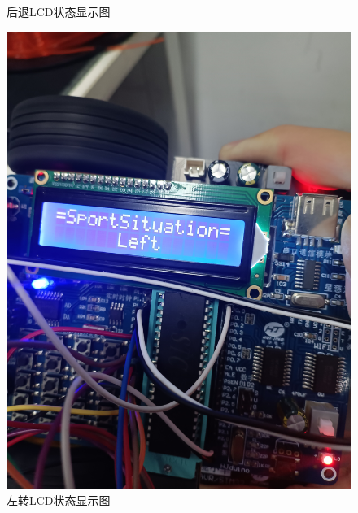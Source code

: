 \begin{figure}[htbp]
\begin{minipage}{0.49\linewidth}
		\caption{后退LCD状态显示图}
		\label{backward}%
	\end{minipage}
	
	\begin{minipage}{0.49\linewidth}
		\centering
		\includegraphics[width=0.9\linewidth]{figures/left.jpg}
		\caption{左转LCD状态显示图}
		\label{left}%
	\end{minipage}
	\begin{minipage}{0.49\linewidth}
		\centering

\end{minipage}
\end{figure}
